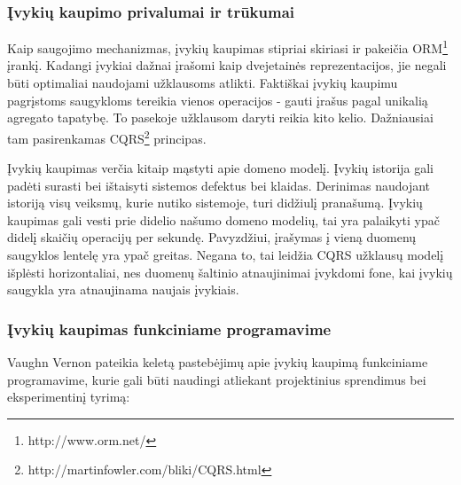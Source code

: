 \subsubsection{Įvykių kaupimo privalumai ir trūkumai}

Kaip saugojimo mechanizmas, įvykių kaupimas stipriai skiriasi ir pakeičia ORM\footnote{http://www.orm.net/} įrankį. Kadangi įvykiai dažnai įrašomi kaip dvejetainės reprezentacijos, jie negali būti optimaliai naudojami užklausoms atlikti. Faktiškai įvykių kaupimu pagrįstoms saugykloms tereikia vienos operacijos - gauti įrašus pagal unikalią agregato tapatybę. To pasekoje užklausom daryti reikia kito kelio. Dažniausiai tam pasirenkamas CQRS\footnote{http://martinfowler.com/bliki/CQRS.html} principas. 

Įvykių kaupimas verčia kitaip mąstyti apie domeno modelį. Įvykių istorija gali padėti surasti bei ištaisyti sistemos defektus bei klaidas. Derinimas naudojant istoriją visų veiksmų, kurie nutiko sistemoje, turi didžiulį pranašumą. Įvykių kaupimas gali vesti prie didelio našumo domeno modelių, tai yra palaikyti ypač didelį skaičių operacijų per sekundę. Pavyzdžiui, įrašymas į vieną duomenų saugyklos lentelę yra ypač greitas. Negana to, tai leidžia CQRS užklausų modelį išplėsti horizontaliai, nes duomenų šaltinio atnaujinimai įvykdomi fone, kai įvykių saugykla yra atnaujinama naujais įvykiais.

\subsubsection{Įvykių kaupimas funkciniame programavime}

Vaughn Vernon pateikia keletą pastebėjimų apie įvykių kaupimą funkciniame programavime, kurie gali būti naudingi atliekant projektinius sprendimus bei eksperimentinį tyrimą:

